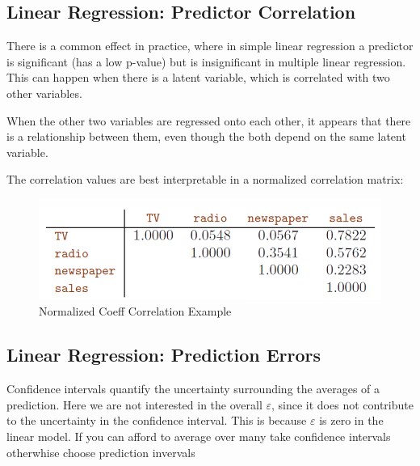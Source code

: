 \documentclass[../Main.tex]{subfiles}
\begin{document}
\subsection{Linear Regression: Predictor Correlation}
There is a common effect in practice, where in simple linear regression a predictor is significant (has a low p-value)
but is insignificant in multiple linear regression.
This can happen when there is a latent variable, which is correlated with two other variables.

When the other two variables are 
regressed onto each other, it appears 
that there is a relationship between 
them, even though the both depend 
on the same latent variable.


The correlation values are best interpretable in a normalized correlation matrix:
\begin{figure}[H]
    \centering
    \includegraphics[width=0.5\linewidth]{Images/corr-example.png}
    \caption{Normalized Coeff Correlation Example}
\end{figure}

\subsection{Linear Regression: Prediction Errors}

Confidence intervals quantify the uncertainty surrounding the averages of a prediction.
Here we are not interested in the overall \(\varepsilon\), since it does not contribute to the uncertainty
in the confidence interval. This is because \(\varepsilon\) is zero in the linear model.
If you can afford to average over many take confidence intervals otherwhise choose prediction invervals
\end{document}
